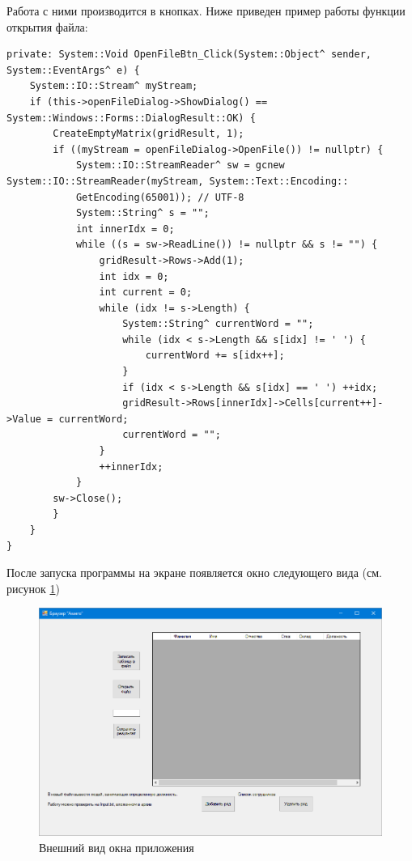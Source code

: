 Работа с ними производится в кнопках. Ниже приведен пример работы
функции открытия файла:
\begin{verbatim}
private: System::Void OpenFileBtn_Click(System::Object^ sender, System::EventArgs^ e) {
	System::IO::Stream^ myStream;
	if (this->openFileDialog->ShowDialog() == System::Windows::Forms::DialogResult::OK) {
		CreateEmptyMatrix(gridResult, 1);
		if ((myStream = openFileDialog->OpenFile()) != nullptr) {
			System::IO::StreamReader^ sw = gcnew System::IO::StreamReader(myStream, System::Text::Encoding::
			GetEncoding(65001)); // UTF-8
			System::String^ s = "";
			int innerIdx = 0;
			while ((s = sw->ReadLine()) != nullptr && s != "") {
				gridResult->Rows->Add(1);
				int idx = 0;
				int current = 0;
				while (idx != s->Length) { 
					System::String^ currentWord = "";
					while (idx < s->Length && s[idx] != ' ') {
						currentWord += s[idx++];
					}
					if (idx < s->Length && s[idx] == ' ') ++idx;
					gridResult->Rows[innerIdx]->Cells[current++]->Value = currentWord;
					currentWord = "";
				}
				++innerIdx;
			}
		sw->Close();
		}
	}
}
\end{verbatim}

После запуска программы на экране появляется окно следующего вида (см. рисунок \ref{fig:exec8})
\begin{figure}[H]
    \centering
    \includegraphics[scale=0.4]{task8/exec.png}
    \caption{Внешний вид окна приложения}
    \label{fig:exec8}
\end{figure}

